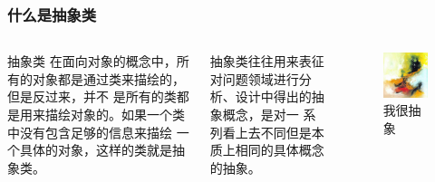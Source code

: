 \documentclass{beamer}
\begin{document}
\begin{frame}[fragile]
  \frametitle{什么是抽象类}

  \begin{columns}
    \begin{alertblock}{抽象类}
      在面向对象的概念中，所有的对象都是通过类来描绘的，但是反过来，并不
      是所有的类都是用来描绘对象的。如果一个类中没有包含足够的信息来描绘
      一个具体的对象，这样的类就是抽象类。
    \end{alertblock}
    \pause
    \begin{block}{}
      抽象类往往用来表征对问题领域进行分析、设计中得出的抽象概念，是对一
      系列看上去不同但是本质上相同的具体概念的抽象。
    \end{block}

    \begin{figure}
      \centering
      \includegraphics[width=\textwidth]{fig-i-am-abstract.jpg}
      \caption{我很抽象}
      \label{fig:i-am-abstract}
    \end{figure}
  \end{columns}
\end{frame}
\end{document}
